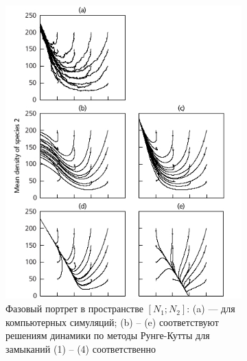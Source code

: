 \begin{figure}[ht]
	\centering
	\begin{subfigure}{.5\textwidth}
		\centering
		\includegraphics[width=.95\linewidth]{1234.png}
		\caption{Фазовый портрет в пространстве $[N_1; N_2]$: (a) --- для компьютерных симуляций; (b) -- (e) соответствуют решениям динамики по методы Рунге-Кутты для замыканий (1) -- (4) соответственно}
		\label{fig:comp1:1}
	\end{subfigure}%
	\begin{subfigure}{.5\textwidth}
		\centering

\end{subfigure}
\end{figure}
